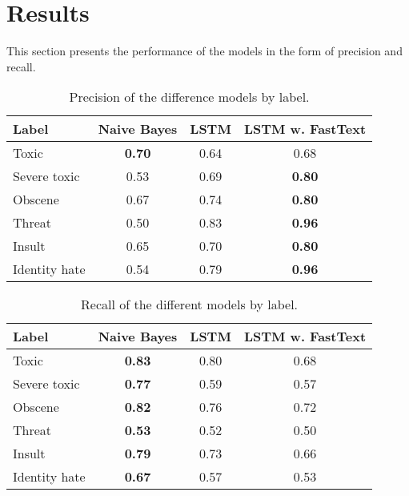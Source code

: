\chapter{Results}
This section presents the performance of the models in the form of precision and recall.

\begin{table}[H]
  \centering
  \caption{Precision of the difference models by label.}\label{tbl:models-precision}
 \begin{tabular}{l | c c c}
    Label         & Naive Bayes & LSTM & LSTM w. FastText \\
    \hline 
    Toxic         & \textbf{0.70} & 0.64 & 0.68 \\
    Severe toxic  & 0.53 & 0.69 & \textbf{0.80} \\
    Obscene       & 0.67 & 0.74 & \textbf{0.80} \\
    Threat        & 0.50 & 0.83 & \textbf{0.96} \\
    Insult        & 0.65 & 0.70 & \textbf{0.80} \\
    Identity hate & 0.54 & 0.79 & \textbf{0.96} \\
  \end{tabular}
\end{table}

\begin{table}[H]
  \centering
  \caption{Recall of the different models by label.}\label{tbl:models-recall}
 \begin{tabular}{l | c c c}
    Label         & Naive Bayes & LSTM & LSTM w. FastText \\
    \hline 
    Toxic         & \textbf{0.83} & 0.80 & 0.68 \\
    Severe toxic  & \textbf{0.77} & 0.59 & 0.57 \\
    Obscene       & \textbf{0.82} & 0.76 & 0.72 \\
    Threat        & \textbf{0.53} & 0.52 & 0.50 \\
    Insult        & \textbf{0.79} & 0.73 & 0.66 \\
    Identity hate & \textbf{0.67} & 0.57 & 0.53 \\
  \end{tabular}
\end{table}

